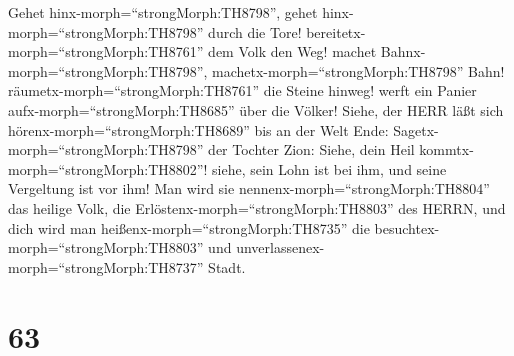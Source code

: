  Gehet hinx-morph=``strongMorph:TH8798'', gehet
hinx-morph=``strongMorph:TH8798'' durch die Tore!
bereitetx-morph=``strongMorph:TH8761'' dem Volk den Weg! machet
Bahnx-morph=``strongMorph:TH8798'', machetx-morph=``strongMorph:TH8798''
Bahn! räumetx-morph=``strongMorph:TH8761'' die Steine hinweg! werft ein
Panier aufx-morph=``strongMorph:TH8685'' über die Völker! 
Siehe, der HERR läßt sich hörenx-morph=``strongMorph:TH8689'' bis an der
Welt Ende: Sagetx-morph=``strongMorph:TH8798'' der Tochter Zion: Siehe,
dein Heil kommtx-morph=``strongMorph:TH8802''! siehe, sein Lohn ist bei
ihm, und seine Vergeltung ist vor ihm!  Man wird sie
nennenx-morph=``strongMorph:TH8804'' das heilige Volk, die
Erlöstenx-morph=``strongMorph:TH8803'' des HERRN, und dich wird man
heißenx-morph=``strongMorph:TH8735'' die
besuchtex-morph=``strongMorph:TH8803'' und
unverlassenex-morph=``strongMorph:TH8737'' Stadt.

\hypertarget{section-62}{%
\section{63}\label{section-62}}

